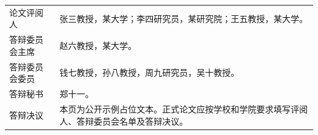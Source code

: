 \begin{tabularx}{\textwidth}{@{}lX@{}}
论文评阅人 & 张三教授，某大学；李四研究员，某研究院；王五教授，某大学。\\[0.6em]
答辩委员会主席 & 赵六教授，某大学。\\[0.6em]
答辩委员会委员 & 钱七教授，孙八教授，周九研究员，吴十教授。\\[0.6em]
答辩秘书 & 郑十一。\\[0.6em]
答辩决议 & 本页为公开示例占位文本。正式论文应按学校和学院要求填写评阅人、答辩委员会名单及答辩决议。\\
\end{tabularx}
